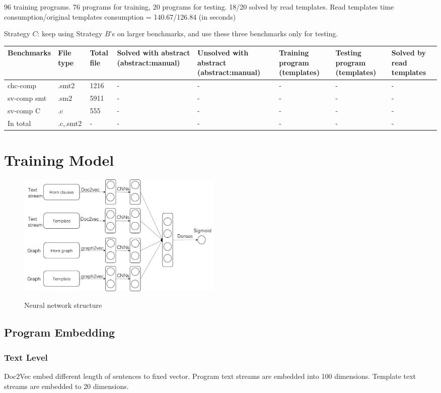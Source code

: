 \documentclass{article}
\begin{document}
96 training programs. 76 programs for training, 20 programs for testing.
18/20 solved by read templates. Read templates time consumption/original templates consumption =  140.67/126.84 (in seconds)

Strategy $C$: keep using Strategy $B$'s on larger benchmarks, and use these three benchmarks only for testing.

\begin{center}
\begin{tabular}{lp{1cm}p{1cm}p{1.5cm}p{1.5cm}p{1.5cm}p{1.5cm}p{1.5cm}}
\hline
Benchmarks & File type & Total file & Solved with abstract (abstract:manual) & Unsolved with abstract (abstract:manual)& Training program (templates) & Testing program (templates) &Solved by read templates\\
\hline
chc-comp & .smt2 & 1216 & -&-&-&-&-\\
sv-comp smt & .sm2 & 5911 & -&-&-&-&-\\
sv-comp C & .c & 555 & - &-&-&-&-\\
In total  & .c,.smt2 & - & -&-&-&-&-\\
\hline
\end{tabular}
\end{center}

\section{Training Model}


\begin{figure}[h]
\centering
  \includegraphics[width=10cm]{graph/NNstructure}\\
  \caption{Neural network structure}\label{NNstructure}
\end{figure}
\subsection{Program Embedding}

\subsubsection{Text Level}
Doc2Vec \cite{DBLP:journals/corr/LeM14} embed different length of sentences to fixed vector.
Program text streams are embedded into 100 dimensions. Template text streams are embedded to 20 dimensions.
\end{document}
